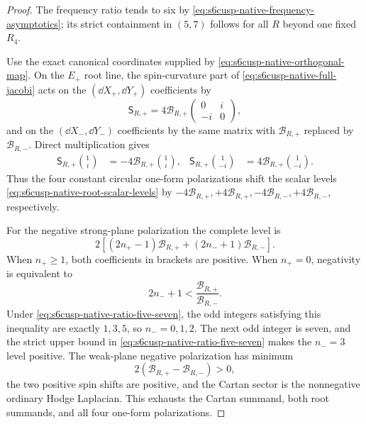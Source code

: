 \begin{proof}
The frequency ratio tends to six by
\eqref{eq:s6cusp-native-frequency-asymptotics}; its strict containment in
\((5,7)\) follows for all \(R\) beyond one fixed \(R_4\).

Use the exact canonical coordinates supplied by
\eqref{eq:s6cusp-native-orthogonal-map}.  On the \(E_+\) root line, the
spin-curvature part of \eqref{eq:s6cusp-native-full-jacobi} acts on the
\((\dd X_+,\dd Y_+)\) coefficients by
\begin{equation}\label{eq:s6cusp-native-strong-spin-matrix}
 \mathsf S_{R,+}
 =4\mathcal B_{R,+}
 \begin{pmatrix}0&i\\-i&0\end{pmatrix},
\end{equation}
and on the \((\dd X_-,\dd Y_-)\) coefficients by the same matrix with
\(\mathcal B_{R,+}\) replaced by \(\mathcal B_{R,-}\).  Direct
multiplication gives
\begin{align*}
 \mathsf S_{R,+}\binom{1}{i}
 &=-4\mathcal B_{R,+}\binom{1}{i},&
 \mathsf S_{R,+}\binom{1}{-i}
 &=4\mathcal B_{R,+}\binom{1}{-i}.
\end{align*}
Thus the four constant circular one-form polarizations shift the scalar
levels \eqref{eq:s6cusp-native-root-scalar-levels} by
\(-4\mathcal B_{R,+},+4\mathcal B_{R,+},
-4\mathcal B_{R,-},+4\mathcal B_{R,-}\), respectively.

For the negative strong-plane polarization the complete level is
\begin{equation}\label{eq:s6cusp-native-strong-negative-full-level}
 2\left[(2n_+-1)\mathcal B_{R,+}
       +(2n_-+1)\mathcal B_{R,-}\right].
\end{equation}
When \(n_+\ge1\), both coefficients in brackets are positive.  When
\(n_+=0\), negativity is equivalent to
\begin{equation*}
 2n_-+1<\frac{\mathcal B_{R,+}}{\mathcal B_{R,-}}.
\end{equation*}
Under \eqref{eq:s6cusp-native-ratio-five-seven}, the odd integers satisfying
this inequality are exactly \(1,3,5\), so
\(n_-=0,1,2\).  The next odd integer is seven, and the strict upper bound in
\eqref{eq:s6cusp-native-ratio-five-seven} makes the \(n_-=3\) level
positive.  The weak-plane negative polarization has minimum
\begin{equation*}
 2(\mathcal B_{R,+}-\mathcal B_{R,-})>0,
\end{equation*}
the two positive spin shifts are positive, and the Cartan sector is the
nonnegative ordinary Hodge Laplacian.  This exhausts the Cartan summand, both
root summands, and all four one-form polarizations.


\end{proof}
